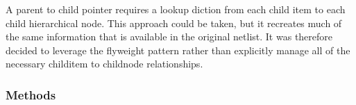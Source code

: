 \documentclass[letterpaper,10pt,english,openany,oneside]{sphinxmanual}
\begin{document}
\begin{fulllineitems}

A parent to child pointer requires a lookup diction from each child item to each child hierarchical node. This
approach could be taken, but it recreates much of the same information that is available in the original netlist. It
was therefore decided to leverage the flyweight pattern rather than explicitly manage all of the necessary
child\sphinxhyphen{}item to child\sphinxhyphen{}node relationships.


\begin{fulllineitems}
\end{fulllineitems}



\begin{fulllineitems}
\end{fulllineitems}


\end{fulllineitems}



\subsubsection{Methods}
\label{\detokenize{reference/classes/href:methods}}
\end{document}
